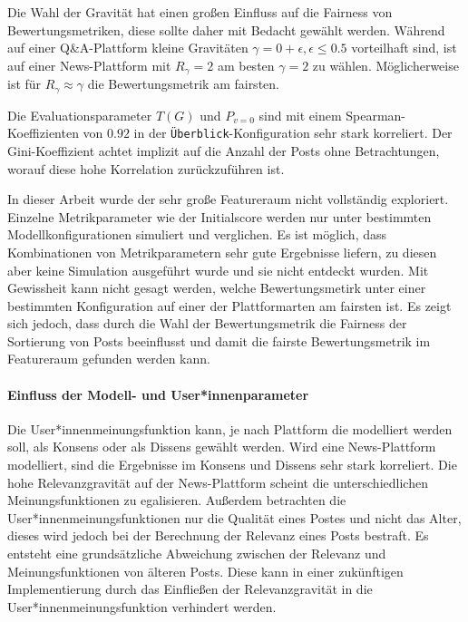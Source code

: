 Die Wahl der Gravität hat einen großen Einfluss auf die Fairness von Bewertungsmetriken, diese sollte daher mit Bedacht gewählt werden. Während auf einer Q\&A-Plattform kleine Gravitäten $\gamma = 0 + \epsilon, \epsilon \leq 0.5$ vorteilhaft sind, ist auf einer News-Plattform mit $R_\gamma = 2$ am besten $\gamma = 2$ zu wählen. Möglicherweise ist für $R_\gamma \approx \gamma$ die Bewertungsmetrik am fairsten.

Die Evaluationsparameter $T(G)$ und $P_{v=0}$ sind mit einem Spearman-Koeffizienten von $0.92$ in der \texttt{Überblick}-Konfiguration sehr stark korreliert. Der Gini-Koeffizient achtet implizit auf die Anzahl der Posts ohne Betrachtungen, worauf diese hohe Korrelation zurückzuführen ist. %

In dieser Arbeit wurde der sehr große Featureraum nicht vollständig exploriert. Einzelne Metrikparameter wie der Initialscore werden nur unter bestimmten Modellkonfigurationen simuliert und verglichen. Es ist möglich, dass Kombinationen von Metrikparametern sehr gute Ergebnisse liefern, zu diesen aber keine Simulation ausgeführt wurde und sie nicht entdeckt wurden. Mit Gewissheit kann nicht gesagt werden, welche Bewertungsmetirk unter einer bestimmten Konfiguration auf einer der Plattformarten am fairsten ist. Es zeigt sich jedoch, dass durch die Wahl der Bewertungsmetrik die Fairness der Sortierung von Posts beeinflusst und damit die fairste Bewertungsmetrik im Featureraum gefunden werden kann.


\paragraph{Einfluss der Modell- und User*innenparameter}

Die User*innenmeinungsfunktion kann, je nach Plattform die modelliert werden soll, als Konsens oder als Dissens gewählt werden. Wird eine News-Plattform modelliert, sind die Ergebnisse im Konsens und Dissens sehr stark korreliert. Die hohe Relevanzgravität auf der News-Plattform scheint die unterschiedlichen Meinungsfunktionen zu egalisieren. Außerdem betrachten die  User*innenmeinungsfunktionen nur die Qualität eines Postes und nicht das Alter, dieses wird jedoch bei der Berechnung der Relevanz eines Posts bestraft. Es entsteht eine grundsätzliche Abweichung zwischen der Relevanz und Meinungsfunktionen von älteren Posts. Diese kann in einer zukünftigen Implementierung durch das Einfließen der Relevanzgravität in die User*innenmeinungsfunktion verhindert werden.

